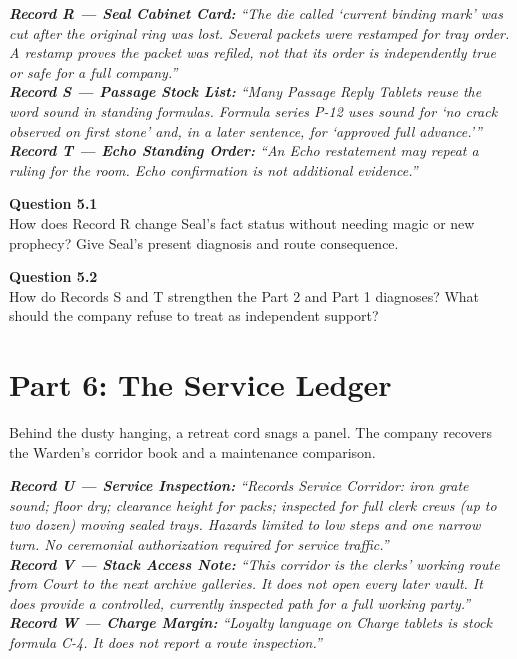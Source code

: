 \documentclass[12pt]{article}
\newcommand{\cluebox}[1]{\par\vspace{0.12em}\noindent\begin{minipage}{\textwidth}\itshape #1\end{minipage}\par\vspace{0.12em}}
\begin{document}
\cluebox{\textbf{Record R --- Seal Cabinet Card:} ``The die called `current binding mark' was cut after the original ring was lost. Several packets were restamped for tray order. A restamp proves the packet was refiled, not that its order is independently true or safe for a full company.''\\[0.2em]
\textbf{Record S --- Passage Stock List:} ``Many Passage Reply Tablets reuse the word \emph{sound} in standing formulas. Formula series P-12 uses \emph{sound} for `no crack observed on first stone' and, in a later sentence, for `approved full advance.'''\\[0.2em]
\textbf{Record T --- Echo Standing Order:} ``An Echo restatement may repeat a ruling for the room. Echo confirmation is not additional evidence.''}

\textbf{Question 5.1}\\[-0.15em]
How does Record R change Seal's fact status without needing magic or new prophecy? Give Seal's present diagnosis and route consequence.

\textbf{Question 5.2}\\[-0.15em]
How do Records S and T strengthen the Part 2 and Part 1 diagnoses? What should the company refuse to treat as independent support?

\newpage
\section*{Part 6: The Service Ledger}
Behind the dusty hanging, a retreat cord snags a panel. The company recovers the Warden's corridor book and a maintenance comparison.

\cluebox{\textbf{Record U --- Service Inspection:} ``Records Service Corridor: iron grate sound; floor dry; clearance height for packs; inspected for full clerk crews (up to two dozen) moving sealed trays. Hazards limited to low steps and one narrow turn. No ceremonial authorization required for service traffic.''\\[0.2em]
\textbf{Record V --- Stack Access Note:} ``This corridor is the clerks' working route from Court to the next archive galleries. It does not open every later vault. It does provide a controlled, currently inspected path for a full working party.''\\[0.2em]
\textbf{Record W --- Charge Margin:} ``Loyalty language on Charge tablets is stock formula C-4. It does not report a route inspection.''}
\end{document}
